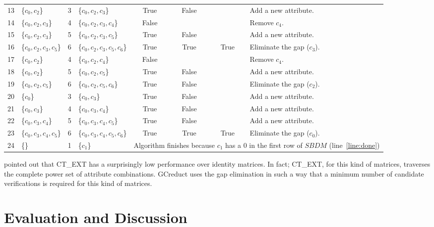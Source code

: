 \documentclass[authoryear,preprint,review,12pt]{elsarticle}
\begin{document}
\begin{table}[!htb]
\begin{tabular}{|c|l|c|l|c|c|c|l|}
    		13 & \{$c_0,c_2$\} 			& 3 & \{$c_0,c_2,c_3$\}			& True & False &   & Add a new attribute.\\
    		14 & \{$c_0,c_2,c_3$\} 		& 4 & \{$c_0,c_2,c_3,c_4$\}		& False &   &   & Remove $c_4$.\\
    		15 & \{$c_0,c_2,c_3$\}		& 5 & \{$c_0,c_2,c_3,c_5$\}		& True & False &   & Add a new attribute.\\
    		16 & \{$c_0,c_2,c_3,c_5$\}	& 6 & \{$c_0,c_2,c_3,c_5,c_6$\} 	& True & True & True & Eliminate the gap ($c_3$).\\
    		17 & \{$c_0,c_2$\} 			& 4 & \{$c_0,c_2,c_4$\}			& False &   &   & Remove $c_4$.\\
    		18 & \{$c_0,c_2$\}			& 5 & \{$c_0,c_2,c_5$\}			& True & False &   & Add a new attribute.\\
    		19 & \{$c_0,c_2,c_5$\}		& 6 & \{$c_0,c_2,c_5,c_6$\}		& True & False &   & Eliminate the gap ($c_2$).\\
    		20 & \{$c_0$\} 				& 3 & \{$c_0,c_3$\}				& True & False &   & Add a new attribute.\\    		
    		21 & \{$c_0,c_3$\}			& 4 & \{$c_0,c_3,c_4$\}			& True & False &   & Add a new attribute.\\
    		22 & \{$c_0,c_3,c_4$\}		& 5 & \{$c_0,c_3,c_4,c_5$\}		& True & False &   & Add a new attribute.\\
    		23 & \{$c_0,c_3,c_4,c_5$\}	& 6 & \{$c_0,c_3,c_4,c_5,c_6$\} 	& True & True & True & Eliminate the gap ($c_0$).\\
    		\hline
    		24 & \{\} 					& 1 & \{$c_1$\} 					& 
    		\multicolumn{4}{l|}{\scriptsize Algorithm finishes because $c_1$ has a 0 in the first row of $SBDM$ (line~\ref{line:done})}\\
    		\hline
		\end{tabular}
	\end{table}
	
	\cite{Alba14} pointed out that CT\_EXT has a surprisingly low performance over identity matrices. 
	In fact; CT\_EXT, for this kind of matrices, traverses the complete power set of attribute combinations. 
	GCreduct uses the gap elimination in such a way that a minimum number of candidate verifications is required 
	for this kind of matrices.
%
\section{Evaluation and Discussion}\label{evaluation}
\end{document}
